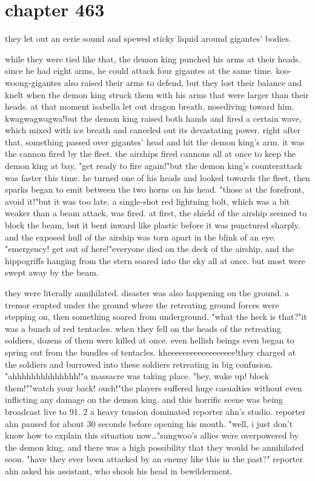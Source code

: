 \section{chapter 463}

they let out an eerie sound and spewed sticky liquid around gigantes' bodies.





while they were tied like that, the demon king punched his arms at their heads.
since he had eight arms, he could attack four gigantes at the same time.
koo-woong-gigantes also raised their arms to defend, but they lost their balance and knelt when the demon king struck them with his arms that were larger than their heads.
at that moment isabella let out dragon breath, nosediving toward him.
kwagwagwagwa!but the demon king raised both hands and fired a certain wave, which mixed with ice breath and canceled out its devastating power.
right after that, something passed over gigantes' head and hit the demon king's arm.
it was the cannon fired by the fleet.
 the airships fired cannons all at once to keep the demon king at bay.
"get ready to fire again!"but the demon king's counterattack was faster this time.
 he turned one of his heads and looked towards the fleet, then sparks began to emit between the two horns on his head.
"those at the forefront, avoid it!"but it was too late.
a single-shot red lightning bolt, which was a bit weaker than a beam attack, was fired.
at first, the shield of the airship seemed to block the beam, but it bent inward like plastic before it was punctured sharply.
 and the exposed hull of the airship was torn apart in the blink of an eye.
"emergency! get out of here!"everyone died on the deck of the airship, and the hippogriffs hanging from the stern soared into the sky all at once.
 but most were swept away by the beam.

they were literally annihilated.
disaster was also happening on the ground.
 a tremor erupted under the ground where the retreating ground forces were stepping on, then something soared from underground.
"what the heck is that?"it was a bunch of red tentacles.
when they fell on the heads of the retreating soldiers, dozens of them were killed at once.
 even hellish beings even began to spring out from the bundles of tentacles.
kheeeeeeeeeeeeeeeeee!they charged at the soldiers and burrowed into these soldiers retreating in big confusion.
"ahhhhhhhhhhhhhh!"a massacre was taking place.
"hey, wake up! block them!""watch your back! ouch!"the players suffered huge casualties without even inflicting any damage on the demon king.
 and this horrific scene was being broadcast live to 91.
2%
a heavy tension dominated reporter ahn's studio.
reporter ahn paused for about 30 seconds before opening his mouth.
"well, i just don't know how to explain this situation now…"sungwoo's allies were overpowered by the demon king.
 and there was a high possibility that they would be annihilated soon.
"have they ever been attacked by an enemy like this in the past?" reporter ahn asked his assistant, who shook his head in bewilderment.


